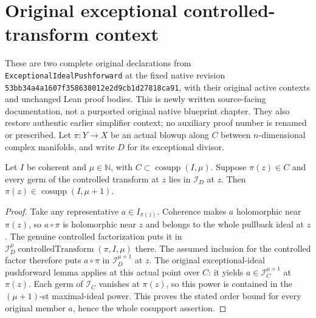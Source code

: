 \section{Original exceptional controlled-transform context}

These are two complete original declarations from
\texttt{ExceptionalIdealPushforward} at the fixed native revision
\texttt{53bb34a4a1607f358638012e2d9cb1d27818ca91}, with their original active
contexts and unchanged Lean proof bodies. This is newly written source-facing
documentation, not a purported original native blueprint chapter. They also
restore authentic earlier simplifier context; no auxiliary proof number is
renamed or prescribed. Let $\pi:Y\to X$ be an actual blowup along $C$ between
$n$-dimensional complex manifolds, and write $D$ for its exceptional divisor.

\begin{lemma}
\label{pub:controlled-exceptional-containment-higher-order}
\notready
Let $I$ be coherent and $\mu\in\mathbb N$, with
$C\subset\operatorname{cosupp}(I,\mu)$. Suppose $\pi(z)\in C$ and every
germ of the controlled transform at $z$ lies in $\mathcal I_D$ at $z$. Then
$\pi(z)\in\operatorname{cosupp}(I,\mu+1)$.
\end{lemma}
\begin{proof}
Take any representative $a\in I_{\pi(z)}$. Coherence makes $a$ holomorphic
near $\pi(z)$, so $a\circ\pi$ is holomorphic near $z$ and belongs to the
whole pullback ideal at $z$. The genuine controlled factorization puts it in
$\mathcal I_D^\mu\operatorname{controlledTransform}(\pi,I,\mu)$ there.
The assumed inclusion for the controlled factor therefore puts $a\circ\pi$
in $\mathcal I_D^{\mu+1}$ at $z$.
The original exceptional-ideal pushforward lemma applies at this actual point
over $C$: it yields $a\in\mathcal I_C^{\mu+1}$ at $\pi(z)$. Each germ of
$\mathcal I_C$ vanishes at $\pi(z)$, so this power is contained in the
$(\mu+1)$-st maximal-ideal power. This proves the stated order bound for every
original member $a$, hence the whole cosupport assertion.
\end{proof}

